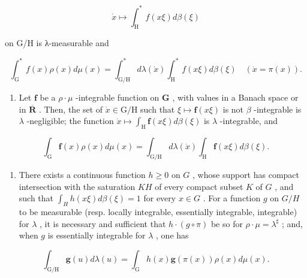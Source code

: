 \[
\dot {x} \mapsto \int_ {\mathrm{H}} ^ {*} f (x \xi) d \beta (\xi)
\]

on G/H is λ-measurable and

\[
\int_ {\mathrm{G}} ^ {*} f (x) \rho (x) d \mu (x) = \int_ {\mathrm{G} / \mathrm{H}} ^ {*} d \lambda (\dot {x}) \int_ {\mathrm{H}} ^ {*} f (x \xi) d \beta (\xi) \quad (\dot {x} = \pi (x)).
\]

\begin{enumerate}
\def\labelenumi{\alph{enumi})}
\setcounter{enumi}{2}
\tightlist
\item
  Let \(\mathbf{f}\) be a \(\rho \cdot \mu\) -integrable function on \(\mathbf{G}\) , with values in a Banach space or in \(\overline{\mathbf{R}}\) . Then, the set of \(\dot{x} \in \mathrm{G} / \mathrm{H}\) such that \(\xi \mapsto \mathbf{f}(x\xi)\) is not \(\beta\) -integrable is \(\lambda\) -negligible; the function \(\dot{x} \mapsto \int_{\mathrm{H}} \mathbf{f}(x\xi) d\beta(\xi)\) is \(\lambda\) -integrable, and
\end{enumerate}

\[
\int_ {\mathrm{G}} \mathbf {f} (x) \rho (x) d \mu (x) = \int_ {\mathrm{G/H}} d \lambda (\dot {x}) \int_ {\mathrm{H}} \mathbf {f} (x \xi) d \beta (\xi).
\]

\begin{enumerate}
\def\labelenumi{\alph{enumi})}
\setcounter{enumi}{3}
\tightlist
\item
  There exists a continuous function \(h \geqslant 0\) on \(G\) , whose support has compact intersection with the saturation \(KH\) of every compact subset \(K\) of \(G\) , and such that \(\int_{H} h(x\xi) d\beta(\xi) = 1\) for every \(x \in G\) . For a function \(g\) on \(G/H\) to be measurable (resp. locally integrable, essentially integrable, integrable) for \(\lambda\) , it is necessary and sufficient that \(h \cdot (g \circ \pi)\) be so for \(\rho \cdot \mu = \lambda^{\sharp}\) ; and, when \(g\) is essentially integrable for \(\lambda\) , one has
\end{enumerate}

\[
\int_ {\mathrm{G/H}} \mathbf {g} (u) d \lambda (u) = \int_ {\mathrm{G}} h (x) \mathbf {g} (\pi (x)) \rho (x) d \mu (x).
\]

